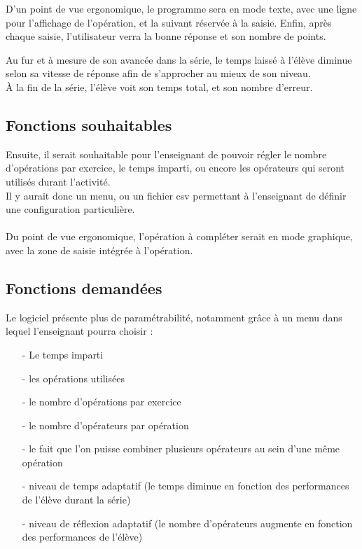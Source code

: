 \documentclass[a4paper,11pt]{report} %
\begin{document}
D'un point de vue ergonomique, le programme sera en mode texte, avec une ligne pour l'affichage de l'opération, et la suivant réservée à la saisie.
Enfin, après chaque saisie, l'utilisateur verra la bonne réponse et son nombre de points.

Au fur et à mesure de son avancée dans la série, le temps laissé à l'élève diminue selon sa vitesse de réponse afin de s'approcher au mieux de son niveau.\\
\`A la fin de la série, l'élève voit son temps total, et son nombre d'erreur.\\

\subsection{Fonctions souhaitables}

Ensuite, il serait souhaitable pour l'enseignant de pouvoir régler le nombre d'opérations par exercice, le temps imparti, ou encore les opérateurs qui seront utilisés  durant l'activité.\\
Il y aurait donc un menu, ou un fichier csv permettant à l'enseignant de définir une configuration particulière.\\ \\

Du point de vue ergonomique, l'opération à compléter serait en mode graphique, avec la zone de saisie intégrée à l'opération. \\

\subsection{Fonctions demandées}

Le logiciel présente plus de paramétrabilité, notamment grâce à un menu dans lequel l'enseignant pourra choisir :\\

\begin{itemize}
\item[-] Le temps imparti
\item[-] les opérations utilisées
\item[-] le nombre d'opérations par exercice
\item[-] le nombre d'opérateurs par opération
\item[-] le fait que l'on puisse combiner plusieurs opérateurs au sein d'une même opération
\item[-] niveau de temps adaptatif (le temps diminue en fonction des performances de l'élève durant la série)
\item[-] niveau de réflexion adaptatif (le nombre d'opérateurs augmente en fonction des performances de l'élève)
\end{itemize}
\end{document}
